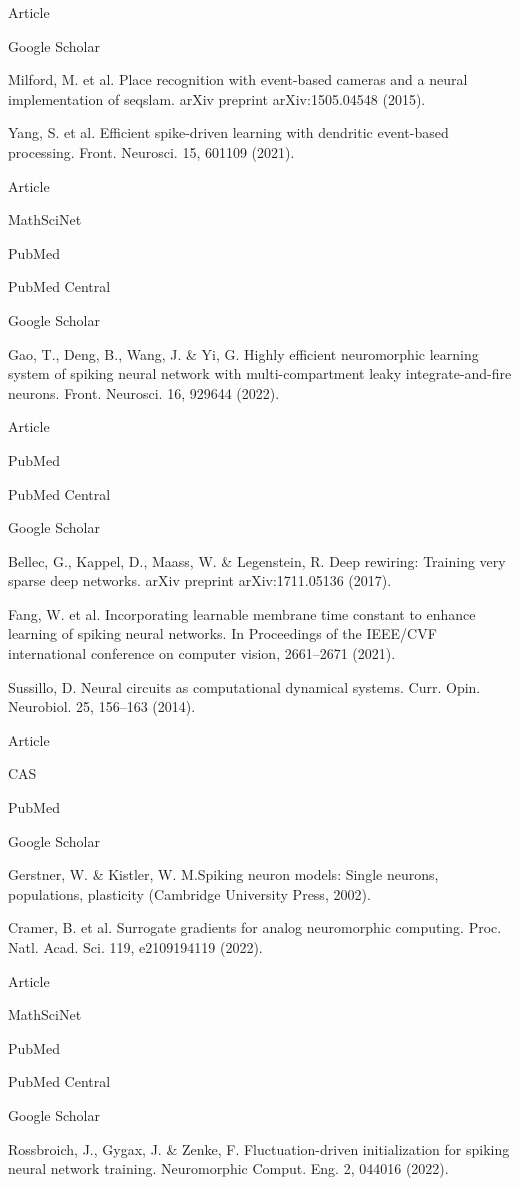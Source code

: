 Article
 
Google Scholar
 

Milford, M. et al. Place recognition with event-based cameras and a neural implementation of seqslam. arXiv preprint arXiv:1505.04548 (2015).

Yang, S. et al. Efficient spike-driven learning with dendritic event-based processing. Front. Neurosci. 15, 601109 (2021).

Article
 
MathSciNet
 
PubMed
 
PubMed Central
 
Google Scholar
 

Gao, T., Deng, B., Wang, J. & Yi, G. Highly efficient neuromorphic learning system of spiking neural network with multi-compartment leaky integrate-and-fire neurons. Front. Neurosci. 16, 929644 (2022).

Article
 
PubMed
 
PubMed Central
 
Google Scholar
 

Bellec, G., Kappel, D., Maass, W. & Legenstein, R. Deep rewiring: Training very sparse deep networks. arXiv preprint arXiv:1711.05136 (2017).

Fang, W. et al. Incorporating learnable membrane time constant to enhance learning of spiking neural networks. In Proceedings of the IEEE/CVF international conference on computer vision, 2661–2671 (2021).

Sussillo, D. Neural circuits as computational dynamical systems. Curr. Opin. Neurobiol. 25, 156–163 (2014).

Article
 
CAS
 
PubMed
 
Google Scholar
 

Gerstner, W. & Kistler, W. M.Spiking neuron models: Single neurons, populations, plasticity (Cambridge University Press, 2002).

Cramer, B. et al. Surrogate gradients for analog neuromorphic computing. Proc. Natl. Acad. Sci. 119, e2109194119 (2022).

Article
 
MathSciNet
 
PubMed
 
PubMed Central
 
Google Scholar
 

Rossbroich, J., Gygax, J. & Zenke, F. Fluctuation-driven initialization for spiking neural network training. Neuromorphic Comput. Eng. 2, 044016 (2022).

